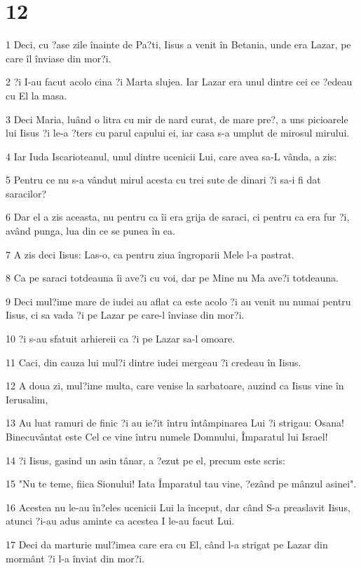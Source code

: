 \chapter{12}

\par 1 Deci, cu ?ase zile înainte de Pa?ti, Iisus a venit în Betania, unde era Lazar, pe care îl înviase din mor?i.
\par 2 ?i I-au facut acolo cina ?i Marta slujea. Iar Lazar era unul dintre cei ce ?edeau cu El la masa.
\par 3 Deci Maria, luând o litra cu mir de nard curat, de mare pre?, a uns picioarele lui Iisus ?i le-a ?ters cu parul capului ei, iar casa s-a umplut de mirosul mirului.
\par 4 Iar Iuda Iscarioteanul, unul dintre ucenicii Lui, care avea sa-L vânda, a zis:
\par 5 Pentru ce nu s-a vândut mirul acesta cu trei sute de dinari ?i sa-i fi dat saracilor?
\par 6 Dar el a zis aceasta, nu pentru ca îi era grija de saraci, ci pentru ca era fur ?i, având punga, lua din ce se punea în ea.
\par 7 A zis deci Iisus: Las-o, ca pentru ziua îngroparii Mele l-a pastrat.
\par 8 Ca pe saraci totdeauna îi ave?i cu voi, dar pe Mine nu Ma ave?i totdeauna.
\par 9 Deci mul?ime mare de iudei au aflat ca este acolo ?i au venit nu numai pentru Iisus, ci sa vada ?i pe Lazar pe care-l înviase din mor?i.
\par 10 ?i s-au sfatuit arhiereii ca ?i pe Lazar sa-l omoare.
\par 11 Caci, din cauza lui mul?i dintre iudei mergeau ?i credeau în Iisus.
\par 12 A doua zi, mul?ime multa, care venise la sarbatoare, auzind ca Iisus vine în Ierusalim,
\par 13 Au luat ramuri de finic ?i au ie?it întru întâmpinarea Lui ?i strigau: Osana! Binecuvântat este Cel ce vine întru numele Domnului, Împaratul lui Israel!
\par 14 ?i Iisus, gasind un asin tânar, a ?ezut pe el, precum este scris:
\par 15 "Nu te teme, fiica Sionului! Iata Împaratul tau vine, ?ezând pe mânzul asinei".
\par 16 Acestea nu le-au în?eles ucenicii Lui la început, dar când S-a preaslavit Iisus, atunci ?i-au adus aminte ca acestea I le-au facut Lui.
\par 17 Deci da marturie mul?imea care era cu El, când l-a strigat pe Lazar din mormânt ?i l-a înviat din mor?i.
